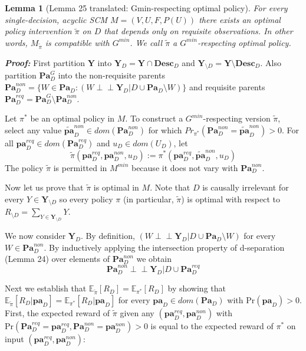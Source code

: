 \documentclass[letterpaper,10pt]{article}
\newtheorem{lemma}[theorem]{Lemma}
\newcommand\indep{\perp \!\!\! \perp}
\begin{document}
\newpage
\begin{lemma}[Lemma 25 translated: Gmin-respecting optimal policy]\label{lemma25:translated}
For every single-decision, acyclic SCM $M=(V,U,F,P(U))$ there exists an optimal policy intervention $\tilde{\pi}$ on $D$ that depends only on requisite observations. In other words, $M_{\tilde{\pi}}$ is compatible with $G^{min}$. We call $\tilde{\pi}$ a $G^{min}$-respecting optimal policy.
\end{lemma}

\textbf{\emph{Proof:}}
First partition $\mathbf{Y}$ into $\mathbf{Y}_D=\mathbf{Y}\cap \textbf{Desc}_D$ and $\mathbf{Y}_{\setminus D}=\mathbf{Y}\setminus \textbf{Desc}_D$.
Also partition $\mathbf{Pa}_D^G$ into the non-requisite parents $\mathbf{Pa}^{non}_D=\{W\in \mathbf{Pa}_D : (W\indep \mathbf{Y}_D | D \cup \mathbf{Pa}_D \setminus W)\}$ and requisite parents $\mathbf{Pa}_D^{req}=\mathbf{Pa}_D^G\setminus\mathbf{Pa}^{non}_D$.

Let $\pi^*$ be an optimal policy in $M$.
To construct a $G^{min}$-respecting version $\tilde{\pi}$, select any value $\mathbf{\tilde{pa}}^{non}_D \in dom(\mathbf{Pa}^{non}_D)$ for which $Pr_{\pi^*}(\mathbf{Pa}^{non}_D = \mathbf{\tilde{pa}}^{non}_D)>0$.
For all $\mathbf{pa}_D^{req} \in dom(\mathbf{Pa}_D^{req})$ and $u_D \in dom(U_D)$, let
\[
\tilde{\pi}(\mathbf{pa}_D^{req},\mathbf{pa}^{non}_D,u_D) := \pi^*(\mathbf{pa}_D^{req},\mathbf{\tilde{pa}}^{non}_D,u_D)
\]
The policy $\tilde{\pi}$ is permitted in $M^{min}$ because it does not vary with $\mathbf{Pa}^{non}_D$.

Now let us prove that $\tilde{\pi}$ is optimal in $M$.
Note that $D$ is causally irrelevant for every $Y\in\mathbf{Y}_{\setminus D}$ so every policy $\pi$ (in particular, $\tilde{\pi}$) is optimal with respect to $R_{\setminus D}=\sum_{Y\in\mathbf{Y}_{\setminus D}}Y$.

We now consider $\mathbf{Y}_D$.
By definition, $(W\indep \mathbf{Y}_D | D \cup \mathbf{Pa}_D \setminus W)$ for every $W\in \mathbf{Pa}^{non}_D$.
By inductively applying the intersection property of d-separation (Lemma 24) over elements of $\mathbf{Pa}^{non}_D$ we obtain
\begin{equation}\label{intersected}
\mathbf{Pa}^{non}_D \indep \mathbf{Y}_D | D \cup \mathbf{Pa}^{req}_D
\end{equation}

Next we establish that $\mathbb{E}_{\tilde{\pi}} [R_{D}]=\mathbb{E}_{\pi^*} [R_{D}]$ by showing that $\mathbb{E}_{\tilde{\pi}} [R_{D}|\mathbf{pa}_D] = \mathbb{E}_{\pi^*} [R_{D}|\mathbf{pa}_D]$ for every $\mathbf{pa}_D\in dom(\mathbf{Pa}_D)$ with $\text{Pr}(\mathbf{pa}_D)>0$.
First, the expected reward of $\tilde{\pi}$ given any $(\mathbf{pa}_D^{req},\mathbf{pa}^{non}_D)$ with $\text{Pr}(\mathbf{Pa}_D^{req}=\mathbf{pa}_D^{req},\mathbf{Pa}^{non}_D=\mathbf{pa}^{non}_D)>0$ is equal to the expected reward of $\pi^*$ on input $(\mathbf{pa}_D^{req},\mathbf{pa}^{non}_D)$:
\end{document}
